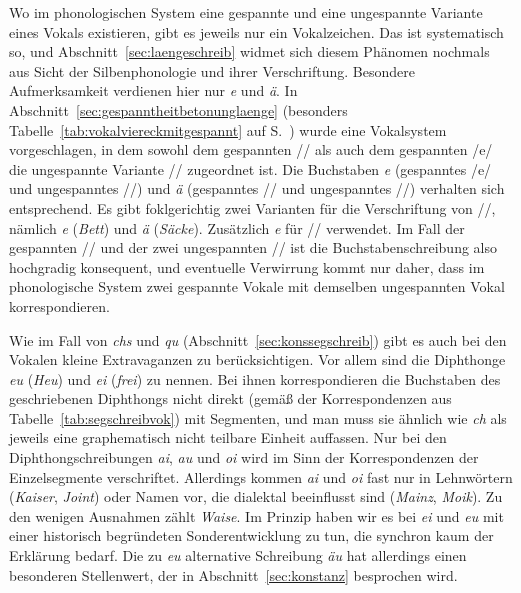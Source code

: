 Wo im phonologischen System eine gespannte und eine ungespannte Variante eines Vokals existieren, gibt es jeweils nur ein Vokalzeichen.
Das ist systematisch so, und Abschnitt~\ref{sec:laengeschreib} widmet sich diesem Phänomen nochmals aus Sicht der Silbenphonologie und ihrer Verschriftung.
Besondere Aufmerksamkeit verdienen hier nur \textit{e} und \textit{ä}.
In Abschnitt~\ref{sec:gespanntheitbetonunglaenge} (besonders Tabelle~\ref{tab:vokalviereckmitgespannt} auf S.~\pageref{tab:vokalviereckmitgespannt}) wurde eine Vokalsystem vorgeschlagen, in dem sowohl dem gespannten // als auch dem gespannten /e/ die ungespannte Variante // zugeordnet ist.
Die Buchstaben \textit{e} (gespanntes /e/ und ungespanntes //) und \textit{ä} (gespanntes // und ungespanntes //) verhalten sich entsprechend.
Es gibt foklgerichtig zwei Varianten für die Verschriftung von //, nämlich \textit{e} (\textit{Bett}) und \textit{ä} (\textit{Säcke}).
Zusätzlich \textit{e} für // verwendet.
Im Fall der gespannten // und der zwei ungespannten // ist die Buchstabenschreibung also hochgradig konsequent, und eventuelle Verwirrung kommt nur daher, dass im phonologische System zwei gespannte Vokale mit demselben ungespannten Vokal korrespondieren.

Wie im Fall von \textit{chs} und \textit{qu} (Abschnitt~\ref{sec:konssegschreib}) gibt es auch bei den Vokalen kleine Extravaganzen zu berücksichtigen.
Vor allem sind die Diphthonge \textit{eu} (\textit{Heu}) und \textit{ei} (\textit{frei}) zu nennen.
Bei ihnen korrespondieren die Buchstaben des geschriebenen Diphthongs nicht direkt (gemäß der Korrespondenzen aus Tabelle~\ref{tab:segschreibvok}) mit Segmenten, und man muss sie ähnlich wie \textit{ch} als jeweils eine graphematisch nicht teilbare Einheit auffassen.
Nur bei den Diphthongschreibungen \textit{ai}, \textit{au} und \textit{oi} wird im Sinn der Korrespondenzen der Einzelsegmente verschriftet.
Allerdings kommen \textit{ai} und \textit{oi} fast nur in Lehnwörtern (\textit{Kaiser}, \textit{Joint}) oder Namen vor, die dialektal beeinflusst sind (\textit{Mainz}, \textit{Moik}).
Zu den wenigen Ausnahmen zählt \textit{Waise}.
Im Prinzip haben wir es bei \textit{ei} und \textit{eu} mit einer historisch begründeten Sonderentwicklung zu tun, die synchron kaum der Erklärung bedarf.
Die zu \textit{eu} alternative Schreibung \textit{äu} hat allerdings einen besonderen Stellenwert, der in Abschnitt~\ref{sec:konstanz} besprochen wird.

